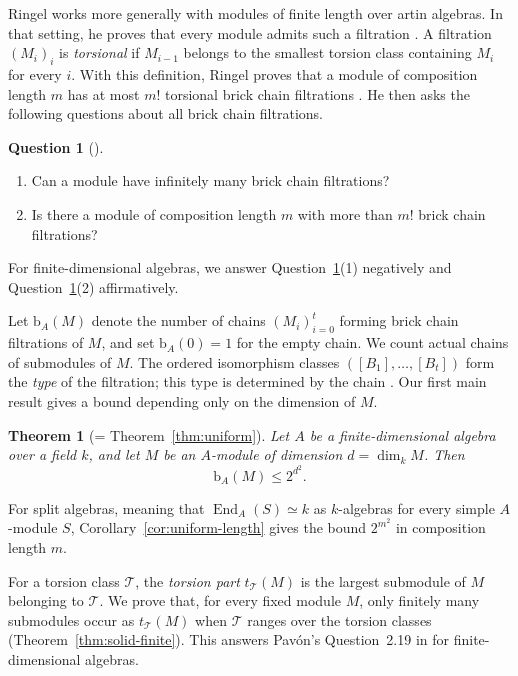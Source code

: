 \documentclass[a4paper,reqno,10pt]{amsart}
\newtheorem{theoremi}{Theorem}
\theoremstyle{definition}
\newtheorem{question}[theorem]{Question}
\numberwithin{equation}{section}
\newcommand{\End}{\operatorname{End}}
\newcommand{\T}{\mathcal T}
\newcommand{\bcount}{\mathrm b}
\begin{document}
Ringel works more generally with modules of finite length over artin
algebras. In that setting, he proves that every module admits such a filtration
\cite[Theorem~1.2]{RingelFiltrations}. A filtration $(M_i)_i$ is
\emph{torsional} if $M_{i-1}$ belongs to the smallest torsion class
containing $M_i$ for every $i$. With this definition, Ringel proves that a module of
composition length $m$ has at most $m!$ torsional brick chain
filtrations \cite[Theorem~3.2]{RingelFiltrations}.
He then asks the following questions about all brick chain filtrations.

\begin{question}[{\cite[Questions following Theorem~3.2]{RingelFiltrations}}]\label{ques:ringel}
\leavevmode
\begin{enumerate}
\item Can a module have infinitely many brick chain filtrations?
\item Is there a module of composition length $m$ with more than $m!$
brick chain filtrations?
\end{enumerate}
\end{question}

For finite-dimensional algebras, we answer Question~\ref{ques:ringel}(1)
negatively and Question~\ref{ques:ringel}(2) affirmatively.

Let $\bcount_A(M)$ denote the number of chains $(M_i)_{i=0}^t$ forming
brick chain filtrations of $M$, and set $\bcount_A(0)=1$ for the empty
chain. We count actual chains of submodules of $M$.
The ordered isomorphism classes
$([B_1],\ldots,[B_t])$ form the \emph{type} of the filtration; this type
is determined by the chain
\cite[Lemma~9.7]{RingelFiltrations}.
Our first main result gives a bound depending only on the dimension of $M$.

\begin{theoremi}[= Theorem~\ref{thm:uniform}]
Let $A$ be a finite-dimensional algebra over a field $k$, and let $M$
be an $A$-module of dimension $d=\dim_k M$. Then
\[
 \bcount_A(M)\leq 2^{d^2}.
\]
\end{theoremi}

For split algebras, meaning that $\End_A(S)\simeq k$ as $k$-algebras
for every simple $A$-module $S$, Corollary~\ref{cor:uniform-length}
gives the bound $2^{m^2}$ in composition length $m$.

For a torsion class $\T$, the \emph{torsion part} $t_\T(M)$ is the
largest submodule of $M$ belonging to $\T$. We prove that, for every
fixed module $M$, only finitely many submodules occur as $t_\T(M)$
when $\T$ ranges over the torsion classes
(Theorem~\ref{thm:solid-finite}). This answers Pav\'on's
Question~2.19 in \cite{Pavon} for finite-dimensional algebras.
\end{document}
